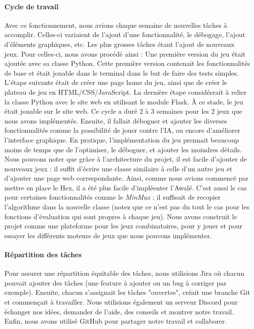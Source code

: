 \paragraph{Cycle de travail}
Avec ce fonctionnement, nous avions chaque semaine de nouvelles tâches à accomplir. Celles-ci variaient de l'ajout d'une fonctionnalité, le débogage, l'ajout d'éléments graphiques, etc.
Les plus grosses tâches étant l'ajout de nouveaux jeux. Pour celles-ci, nous avons procédé ainsi :
Une première version du jeu était ajoutée avec sa classe Python. Cette première version contenait les fonctionnalités de base et était jouable dans le terminal dans le but de faire des tests simples. 
L'étape suivante était de créer une page home du jeu, ainsi que de créer le plateau de jeu en HTML/CSS/JavaScript. La dernière étape considésrait à relier la classe 
Python avec le site web en utilisant le module Flask.
À ce stade, le jeu était jouable sur le site web. Ce cycle a duré 2 à 3 semaines pour les 2 jeux que nous avons implémentés. Ensuite, il fallait déboguer et ajouter les 
diverses fonctionnalités comme la possibilité de jouer contre l'IA, ou encore d'améliorer l'interface graphique. En pratique, l'implémentation du jeu prennait beaucoup moins de temps que de l'optimiser, 
le déboguer, et ajouter les moindres détails.
Nous pouvons noter que grâce à l'architecture du projet, il est facile d'ajouter de nouveaux jeux : il suffit d'écrire une classe similaire à celle d'un autre jeu et d'ajouter une 
page web correspondante. Ainsi, comme nous avions commencé par mettre en place le Hex, il a été plus facile d'impléenter l'Awalé.
C'est aussi le cas pour certaines fonctionnalités comme le \emph{MinMax} : il suffisait de recopier l'algorithme dans la nouvelle classe (notez que ce n'est pas du 
tout le cas pour les fonctions d'évaluation qui sont propres à chaque jeu).
Nous avons construit le projet comme une plateforme pour les jeux combinatoires, pour y jouer et pour essayer les différents moteurs de jeux que nous pouvons implémenter.

\paragraph{Répartition des tâches}
Pour assurer une répartition équitable des tâches, nous utilisions Jira où chacun pouvait ajouter des tâches (une feature à ajouter ou un bug à corriger par exemple). 
Ensuite, chacun s'assignait les tâches "ouvertes", créait une branche Git et commençait à travailler. Nous utilisions également un serveur Discord pour échanger 
nos idées, demander de l'aide, des conseils et montrer notre travail. Enfin, nous avons utilisé GitHub pour partager notre travail et collaborer.



